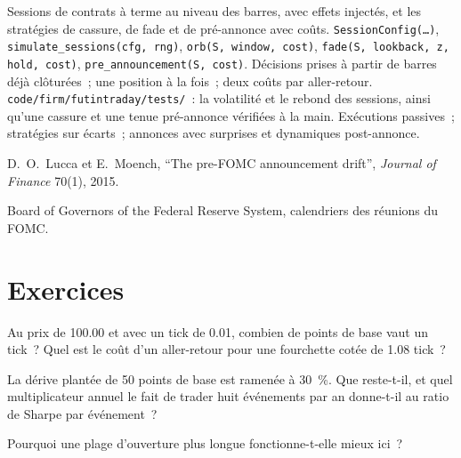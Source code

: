 \begin{build}
 Sessions de contrats à terme au niveau des barres, avec effets injectés, et les stratégies de cassure, de fade et de pré-annonce avec coûts.
 \texttt{SessionConfig(\dots)}, \texttt{simulate\_sessions(cfg, rng)}, \texttt{orb(S, window, cost)},
\texttt{fade(S, lookback, z, hold, cost)}, \texttt{pre\_announcement(S, cost)}.
 Décisions prises à partir de barres déjà clôturées~; une position à la fois~; deux coûts par aller-retour.
 \texttt{code/firm/futintraday/tests/}~: la volatilité et le rebond des sessions, ainsi qu'une cassure et une tenue pré-annonce vérifiées à la main.
 Exécutions passives~; stratégies sur écarts~; annonces avec surprises et dynamiques post-annonce.
\end{build}

\begin{omsources}
\item D.~O.~Lucca et E.~Moench, ``The pre-FOMC announcement drift'', \emph{Journal of Finance} 70(1), 2015.
\item Board of Governors of the Federal Reserve System, calendriers des réunions du FOMC.
\end{omsources}

\section{Exercices}

\begin{exercise}[$\star$]\label{exo:s1:short-term-futures-strategies:1}
Au prix de 100.00 et avec un tick de 0.01, combien de points de base vaut un tick~? Quel est le coût d'un aller-retour pour une fourchette cotée de 1.08 tick~?
\end{exercise}

\begin{exercise}[$\star$]\label{exo:s1:short-term-futures-strategies:2}
La dérive plantée de 50 points de base est ramenée à 30~\%. Que reste-t-il, et quel multiplicateur annuel le fait de trader huit événements par an
donne-t-il au ratio de Sharpe par événement~?
\end{exercise}

\begin{exercise}[$\star$]\label{exo:s1:short-term-futures-strategies:3}
Pourquoi une plage d'ouverture plus longue fonctionne-t-elle mieux ici~?
\end{exercise}

